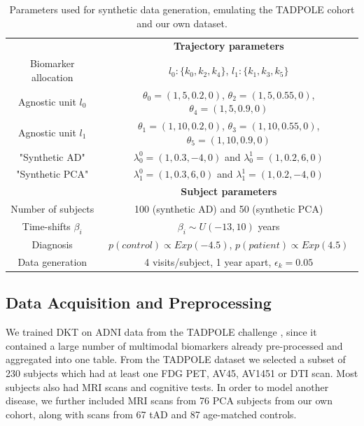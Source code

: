 \documentclass{llncs}
\begin{document}
 \begin{table}
\fontsize{6}{8}\selectfont
 \centering
 \begin{tabular}{c | c}
& \textbf{Trajectory parameters} \\
 Biomarker allocation &  $l_0:\{k_0, k_2, k_4\}$, $l_1: \{k_1, k_3, k_5\}$ \\
Agnostic unit $l_0$ &  $\theta_0 = (1,5,0.2,0)$, $\theta_2 = (1,5,0.55,0)$,  $\theta_4 = (1,5,0.9,0)$  \\
Agnostic unit $l_1$ & $\theta_1 = (1,10,0.2,0)$, $\theta_3 = (1,10,0.55,0)$, $\theta_5 = (1,10,0.9,0)$ \\
  
"Synthetic AD" & $\lambda_0^0 = (1, 0.3, -4, 0)$  and $\lambda_0^1 = (1, 0.2, 6, 0)$ \\
 "Synthetic PCA" & $\lambda_1^0 = (1, 0.3, 6, 0)$ and $\lambda_1^1 = (1, 0.2, -4, 0)$ \\
\hline
& \textbf{Subject parameters} \\
 Number of subjects & 100 (synthetic AD) and 50 (synthetic PCA) \\ 
 Time-shifts $\beta_i$ & $\beta_i \sim U(-13,10)$ years \\
 Diagnosis & $p(control) \propto Exp (-4.5)$,  $p(patient) \propto Exp (4.5)$\\
 Data generation & 4 visits/subject, 1 year apart, $\epsilon_k = 0.05$\\ 
\end{tabular}
\caption{Parameters used for synthetic data generation, emulating the TADPOLE cohort and our own dataset.}
\label{tab:synParams}
\end{table}



\subsection{Data Acquisition and Preprocessing}

We trained DKT on ADNI data from the TADPOLE challenge \cite{marinescu2018tadpole}, since it contained a large number of multimodal biomarkers already pre-processed and aggregated into one table. From the TADPOLE dataset we selected a subset of 230 subjects which had at least one FDG PET, AV45, AV1451 or DTI scan. Most subjects also had MRI scans and cognitive tests. In order to model another disease, we further included MRI scans from 76 PCA subjects from our own cohort, along with scans from 67 tAD and 87 age-matched controls.
 
\end{document}
